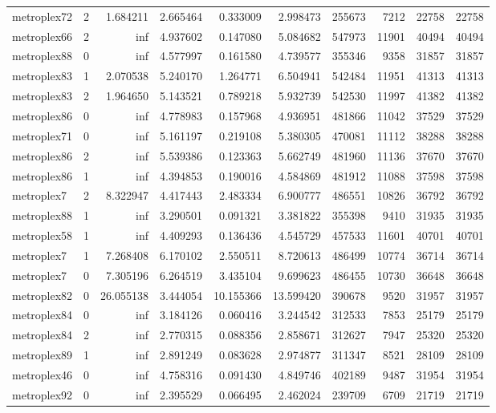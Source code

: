 \begin{longtable}{|l|r|r|r|r|r|r|r|r|r|}
metroplex72 & 2 & 1.684211 & 2.665464 & 0.333009 & 2.998473 & 255673 & 7212 & 22758 & 22758 \\
metroplex66 & 2 & inf & 4.937602 & 0.147080 & 5.084682 & 547973 & 11901 & 40494 & 40494 \\
metroplex88 & 0 & inf & 4.577997 & 0.161580 & 4.739577 & 355346 & 9358 & 31857 & 31857 \\
metroplex83 & 1 & 2.070538 & 5.240170 & 1.264771 & 6.504941 & 542484 & 11951 & 41313 & 41313 \\
metroplex83 & 2 & 1.964650 & 5.143521 & 0.789218 & 5.932739 & 542530 & 11997 & 41382 & 41382 \\
metroplex86 & 0 & inf & 4.778983 & 0.157968 & 4.936951 & 481866 & 11042 & 37529 & 37529 \\
metroplex71 & 0 & inf & 5.161197 & 0.219108 & 5.380305 & 470081 & 11112 & 38288 & 38288 \\
metroplex86 & 2 & inf & 5.539386 & 0.123363 & 5.662749 & 481960 & 11136 & 37670 & 37670 \\
metroplex86 & 1 & inf & 4.394853 & 0.190016 & 4.584869 & 481912 & 11088 & 37598 & 37598 \\
metroplex7 & 2 & 8.322947 & 4.417443 & 2.483334 & 6.900777 & 486551 & 10826 & 36792 & 36792 \\
metroplex88 & 1 & inf & 3.290501 & 0.091321 & 3.381822 & 355398 & 9410 & 31935 & 31935 \\
metroplex58 & 1 & inf & 4.409293 & 0.136436 & 4.545729 & 457533 & 11601 & 40701 & 40701 \\
metroplex7 & 1 & 7.268408 & 6.170102 & 2.550511 & 8.720613 & 486499 & 10774 & 36714 & 36714 \\
metroplex7 & 0 & 7.305196 & 6.264519 & 3.435104 & 9.699623 & 486455 & 10730 & 36648 & 36648 \\
metroplex82 & 0 & 26.055138 & 3.444054 & 10.155366 & 13.599420 & 390678 & 9520 & 31957 & 31957 \\
metroplex84 & 0 & inf & 3.184126 & 0.060416 & 3.244542 & 312533 & 7853 & 25179 & 25179 \\
metroplex84 & 2 & inf & 2.770315 & 0.088356 & 2.858671 & 312627 & 7947 & 25320 & 25320 \\
metroplex89 & 1 & inf & 2.891249 & 0.083628 & 2.974877 & 311347 & 8521 & 28109 & 28109 \\
metroplex46 & 0 & inf & 4.758316 & 0.091430 & 4.849746 & 402189 & 9487 & 31954 & 31954 \\
metroplex92 & 0 & inf & 2.395529 & 0.066495 & 2.462024 & 239709 & 6709 & 21719 & 21719 \\

\end{longtable}
